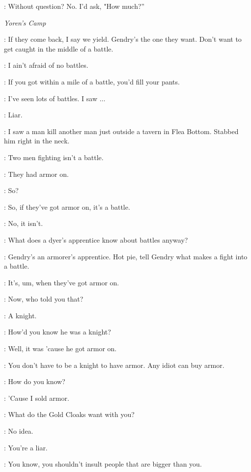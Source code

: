 \BRONN: Without question? No. I'd ask, "How much?''


\scene

\textit{Yoren's Camp}

\LOMMY: If they come back, I say we yield. Gendry's the one they want. Don't want to get caught in the middle of a battle.

\HOTPIE: I ain't afraid of no battles.

\ARYA: If you got within a mile of a battle, you'd fill your pants.

\HOTPIE: I've seen lots of battles. I saw $\ldots$

\ARYA: Liar.

\HOTPIE: I saw a man kill another man just outside a tavern in Flea Bottom. Stabbed him right in the neck.

\LOMMY: Two men fighting isn't a battle.

\HOTPIE: They had armor on.

\ARYA: So?

\HOTPIE: So, if they've got armor on, it's a battle.

\LOMMY: No, it isn't.

\HOTPIE: What does a dyer's apprentice know about battles anyway?


\ARYA: Gendry's an armorer's apprentice. Hot pie, tell Gendry what makes a fight into a battle.

\HOTPIE: It's, um, when they've got armor on.

\GENDRY: Now, who told you that?

\HOTPIE: A knight.

\GENDRY: How'd you know he was a knight?

\HOTPIE: Well, it was 'cause he got armor on.

\GENDRY: You don't have to be a knight to have armor. Any idiot can buy armor.

\HOTPIE: How do you know?

\GENDRY: 'Cause I sold armor.


\ARYA: What do the Gold Cloaks want with you?

\GENDRY: No idea.

\ARYA: You're a liar.

\GENDRY: You know, you shouldn't insult people that are bigger than you.

